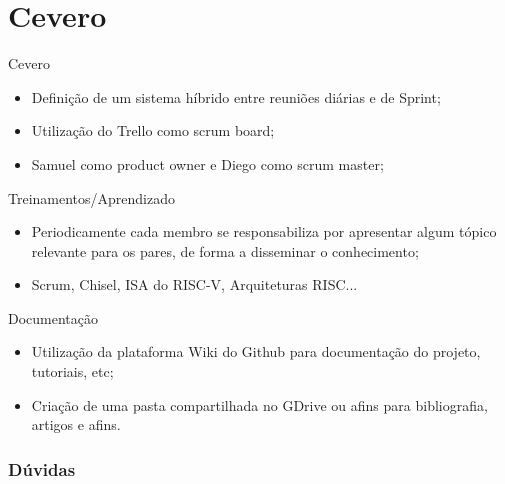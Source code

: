 \section{Cevero}
\begin{frame}{Cevero}
  \begin{itemize}[<+->]
    \item Definição de um sistema híbrido entre reuniões diárias e de Sprint;
    \item Utilização do Trello como scrum board;
    \item Samuel como product owner e Diego como scrum master;
  \end{itemize}
\end{frame}

\begin{frame}{Treinamentos/Aprendizado}
  \begin{itemize}[<+->]
    \item Periodicamente cada membro se responsabiliza por apresentar algum tópico relevante para os pares, de forma a disseminar o conhecimento;
    \item Scrum, Chisel, ISA do RISC-V, Arquiteturas RISC...
  \end{itemize}
\end{frame}

\begin{frame}{Documentação}
  \begin{itemize}[<+->]
    \item Utilização da plataforma Wiki do Github para documentação do projeto, tutoriais, etc;
    \item Criação de uma pasta compartilhada no GDrive ou afins para bibliografia, artigos e afins.
  \end{itemize}
\end{frame}

\begin{frame}
  \frametitle{Dúvidas}
  \begin{center}
  \end{center}
\end{frame}


